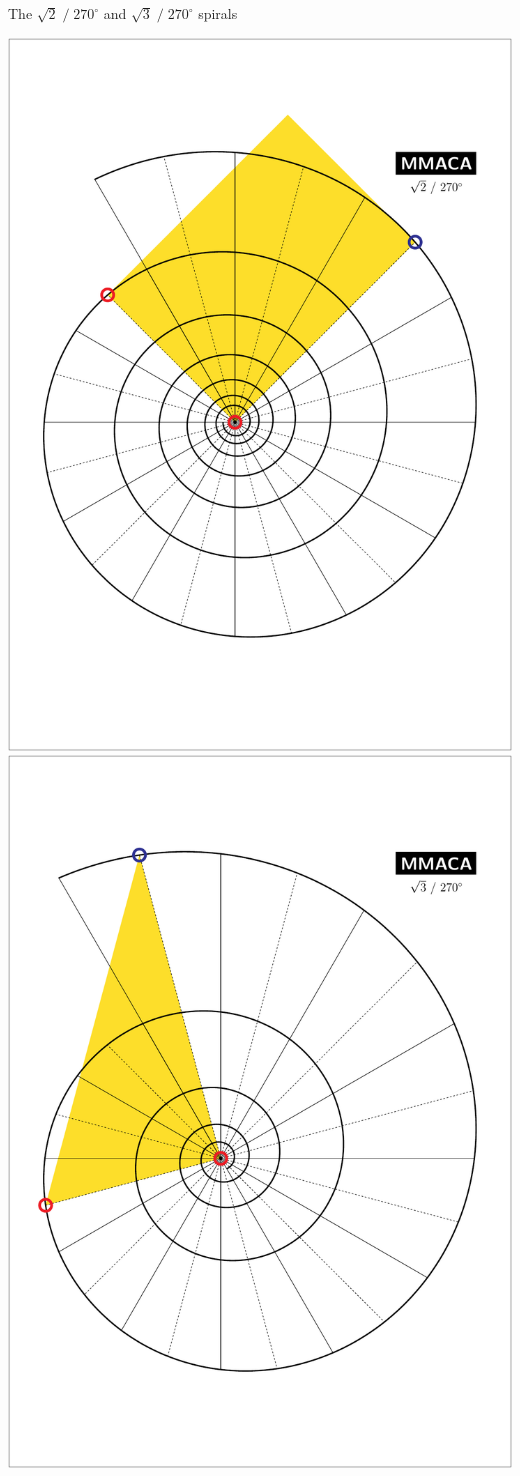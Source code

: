 \documentclass[14pt]{beamer}
\begin{document}

    \begin{frame}{The\; $\sqrt{2}\;/\;270^\circ$\; and\; $\sqrt{3}\;/\;270^\circ$ spirals}
        \begin{center}
            \includegraphics[height=34ex]{pictures/Example_6.pdf}\quad
            \includegraphics[height=34ex]{pictures/Example_7.pdf}
        \end{center}
    \end{frame}

    
\end{document}
